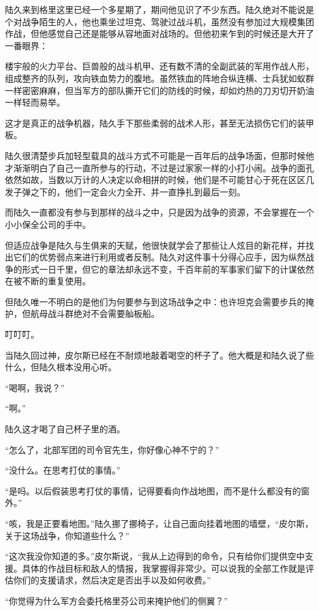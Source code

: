 陆久来到格里这里已经一个多星期了，期间他见识了不少东西。陆久绝对不能说是个对战争陌生的人，他也乘坐过坦克、驾驶过战斗机，虽然没有参加过大规模集团作战，但他感觉自己还是能够从容地面对战场的。但他初来乍到的时候还是大开了一番眼界：

楼宇般的火力平台、巨兽般的战斗机甲、还有数不清的全副武装的军用作战人形，组成整齐的队列，攻向铁血势力的腹地。虽然铁血的阵地合纵连横、士兵犹如蚁群一样密密麻麻，但当军方的部队撕开它们的防线的时候，却如灼热的刀刃切开奶油一样轻而易举。

这才是真正的战争机器，陆久手下那些柔弱的战术人形，甚至无法损伤它们的装甲板。

陆久很清楚步兵加轻型载具的战斗方式不可能是一百年后的战争场面，但那时候他才渐渐明白了自己一直所参与的行动，不过是过家家一样的小打小闹。战争的面孔依然如故，当数以万计的人决定以命相拼的时候，他们是不可能甘心于死在区区几发子弹之下的，他们一定会火力全开、并一直挣扎到最后一刻。

而陆久一直都没有参与到那样的战斗之中，只是因为战争的资源，不会掌握在一个小小保全公司的手中。

但适应战争是陆久与生俱来的天赋，他很快就学会了那些让人炫目的新花样，并找出它们的优势弱点来进行利用或者反制。陆久对这件事十分得心应手，因为纵然战争的形式一日千里，但它的章法却永远不变，千百年前的军事家们留下的计谋依然在被不断的重复使用。

但陆久唯一不明白的是他们为何要参与到这场战争之中：也许坦克会需要步兵的掩护，但航母战斗群绝对不会需要舢板船。

叮叮叮。

当陆久回过神，皮尔斯已经在不耐烦地敲着喝空的杯子了。他大概是和陆久说了些什么，但陆久根本没用心听。

“喝啊，我说？”

“啊。”

陆久这才喝了自己杯子里的酒。

“怎么了，北部军团的司令官先生，你好像心神不宁的？”

“没什么。在思考打仗的事情。”

“是吗。以后假装思考打仗的事情，记得要看向作战地图，而不是什么都没有的窗外。”

“咳，我是正要看地图。”陆久挪了挪椅子，让自己面向挂着地图的墙壁，“皮尔斯，关于这场战争，你知道些什么？”

“这次我没你知道的多。”皮尔斯说，“我从上边得到的命令，只有给你们提供空中支援。具体的作战目标和敌人的情报，我掌握得非常少。可以说我的全部工作就是评估你们的支援请求，然后决定是否出手以及如何收费。”

“你觉得为什么军方会委托格里芬公司来掩护他们的侧翼？”

